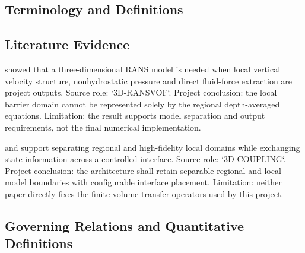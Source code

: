 \subsection{Terminology and Definitions}
\label{sec:res-mod-sys-definitions}


\subsection{Literature Evidence}
\label{sec:res-mod-sys-literature-evidence}

%

\textcite{qin2018comparison} showed that a three-dimensional RANS
model is needed when local vertical velocity structure, nonhydrostatic
pressure and direct fluid-force extraction are project outputs. Source
role: `3D-RANSVOF`. Project conclusion: the local barrier domain cannot
be represented solely by the regional depth-averaged equations.
Limitation: the result supports model separation and output
requirements, not the final numerical implementation.

\textcite{takase2016hybrid} and \textcite{romano2025coupling} support
separating regional and high-fidelity local domains while exchanging
state information across a controlled interface. Source role:
`3D-COUPLING`. Project conclusion: the architecture shall retain
separable regional and local model boundaries with configurable
interface placement. Limitation: neither paper directly fixes the
finite-volume transfer operators used by this project.

\subsection{Governing Relations and Quantitative Definitions}
\label{sec:res-mod-sys-governing-relations}

%

